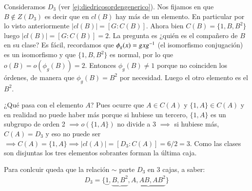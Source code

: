 \begin{ej}
	Consideramos $D_3$ (ver \autoref{ej:diedricosordengenerico}). Nos fijamos en que $B \not\in Z(D_3)$ es decir que en $cl(B)$ hay más de un elemento. En particular por lo visto anteriormente $|cl(B)| = [G:C(B)]$. Ahora bien $C(B) = \{1, B, B^2\}$ luego $|cl(B)| = [G:C(B)] = 2$. La pregunta es ¿quién es el compañero de $B$ en su clase? Es fácil, recordamos que $\phi_g (x) = gxg^{-1}$ (el isomorfismo conjugación) es un isomorfismo y que $\{1, B, B^2\}$ es normal, por lo que $o(B) = o(\phi_g(B)) = 2$. Entonces $\phi_g(B) \neq 1$ porque no coinciden los órdenes, de manera que $\phi_g(B) = B^2$ por necesidad. Luego el otro elemento es el $B^2$.
	
	¿Qué pasa con el elemento $A$? Pues ocurre que $A \in C(A)$ y $\{1, A\} \in C(A)$ y en realidad no puede haber más porque si hubiese un tercero, $\{1, A\}$ es un subgrupo de orden 2 $\implies o(\{1, A\})$ no divide a 3 $\implies$ si hubiese más, $C(A) = D_3$ y eso no puede ser $\implies C(A) = \{1, A\} \implies |cl(A)| = [D_3:C(A)] = 6/2 = 3$. Como las clases son disjuntas los tres elementos sobrantes forman la última caja.   
	
	Para conlcuir queda que la relación $\sim$ parte $D_3$ en 3 cajas, a saber:
	\begin{align*}
	D_3 = \{\underbrace{1}, \underbrace{B, B^2}, \underbrace{A, AB, AB^2}\}
	\end{align*}
\end{ej}


